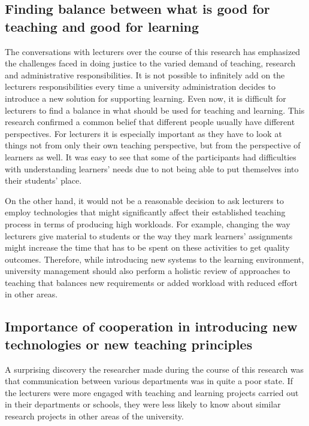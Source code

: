 \subsection[Finding Balance]{Finding balance between what is good for teaching
and good for learning}

The conversations with lecturers over the course of this research has emphasized
the challenges faced in doing justice to the varied demand of teaching, research
and administrative responsibilities. It is not possible to infinitely add on the
lecturers responsibilities every time a university administration decides to
introduce a new solution for supporting learning. Even now, it is difficult for
lecturers to find a balance in what should be used for teaching and learning.
This research confirmed a common belief that different people usually have
different perspectives. For lecturers it is especially important as they have to
look at things not from only their own teaching perspective, but from the
perspective of learners as well. It was easy to see that some of the
participants had difficulties with understanding learners' needs due to not
being able to put themselves into their students' place.

On the other hand, it would not be a reasonable decision to ask lecturers to
employ technologies that might significantly affect their established
teaching process in terms of producing high workloads. For example, changing the
way lecturers give material to students or the way they mark learners'
assignments might increase the time that has to be spent on these activities to
get quality outcomes. Therefore, while introducing new systems to the learning
environment, university management should also perform a holistic review of
approaches to teaching that balances new requirements or added workload with
reduced effort in other areas.

\subsection[Cooperation and Communication]{Importance of cooperation in 
introducing new technologies or new teaching principles}

A surprising discovery the researcher made during the course of this research
was that communication between various departments was in quite a poor state. If
the lecturers were more engaged with teaching and learning projects carried out
in their departments or schools, they were less likely to know about similar
research projects in other areas of the university.

